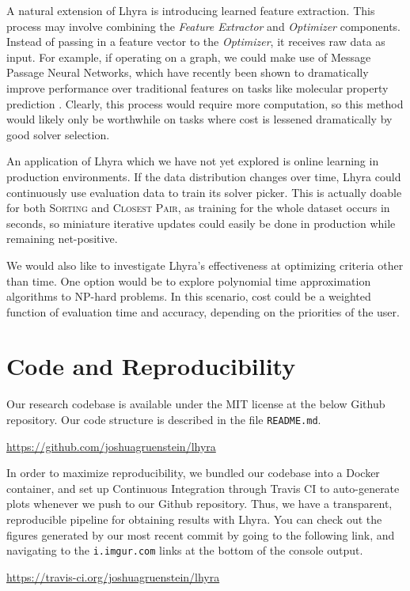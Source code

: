 \documentclass{article}
\begin{document}
A natural extension of Lhyra is introducing learned feature extraction. This process may involve combining the \textit{Feature Extractor} and \textit{Optimizer} components. Instead of passing in a feature vector to the \textit{Optimizer}, it receives raw data as input. For example, if operating on a graph, we could make use of Message Passage Neural Networks, which have recently been shown to dramatically improve performance over traditional features on tasks like molecular property prediction \cite{GilmerSRVD17}. Clearly, this process would require more computation, so this method would likely only be worthwhile on tasks where cost is lessened dramatically by good solver selection.

An application of Lhyra which we have not yet explored is online learning in production environments.  If the data distribution changes over time, Lhyra could continuously use evaluation data to train its solver picker.  This is actually doable for both \textsc{Sorting} and \textsc{Closest Pair}, as training for the whole dataset occurs in seconds, so miniature iterative updates could easily be done in production while remaining net-positive.

We would also like to investigate Lhyra's effectiveness at optimizing criteria other than time. One option would be to explore polynomial time approximation algorithms to NP-hard problems. In this scenario, cost could be a weighted function of evaluation time and accuracy, depending on the priorities of the user.




\appendix
\section{Code and Reproducibility}

Our research codebase is available under the MIT license at the below Github repository.  Our code structure is described in the file \texttt{README.md}.

\begin{center}
\url{https://github.com/joshuagruenstein/lhyra}
\end{center}

In order to maximize reproducibility, we bundled our codebase into a Docker container, and set up Continuous Integration through Travis CI to auto-generate plots whenever we push to our Github repository.  Thus, we have a transparent, reproducible pipeline for obtaining results with Lhyra.  You can check out the figures generated by our most recent commit by going to the following link, and navigating to the \texttt{i.imgur.com} links at the bottom of the console output.

\begin{center}
\url{https://travis-ci.org/joshuagruenstein/lhyra}
\end{center}
\end{document}
